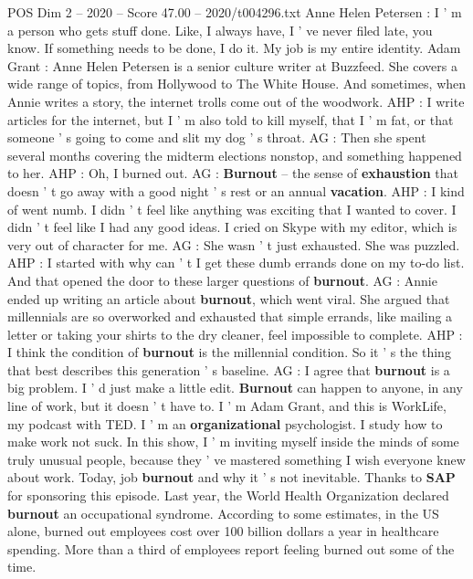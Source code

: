 \begin{textsample}{POS Dim 2 – 2020 – Score 47.00 – 2020/t004296.txt}  \label{ex:f2_pos_005}
Anne Helen Petersen : I ' m a person who gets stuff done.
Like, I always have, I ' ve never filed late, you know.
If something needs to be done, I do it.
My job is my entire identity.
Adam Grant : Anne Helen Petersen is a senior culture writer at Buzzfeed.
She covers a wide range of topics, from Hollywood to The White House.
And sometimes, when Annie writes a story, the internet trolls come out of the woodwork.
AHP : I write articles for the internet, but I ' m also told to kill myself, that I ' m fat, or that someone ' s going to come and slit my dog ' s throat.
AG : Then she spent several months covering the midterm elections nonstop, and something happened to her.
AHP : Oh, I burned out.
AG : \textbf{Burnout} -- the sense of \textbf{exhaustion} that doesn ' t go away with a good night ' s rest or an annual \textbf{vacation}.
AHP : I kind of went numb.
I didn ' t feel like anything was exciting that I wanted to cover.
I didn ' t feel like I had any good ideas.
I cried on Skype with my editor, which is very out of character for me.
AG : She wasn ' t just exhausted.
She was puzzled.
AHP : I started with why can ' t I get these dumb errands done on my to-do list.
And that opened the door to these larger questions of \textbf{burnout}.
AG : Annie ended up writing an article about \textbf{burnout}, which went viral.
She argued that millennials are so overworked and exhausted that simple errands, like mailing a letter or taking your shirts to the dry cleaner, feel impossible to complete.
AHP : I think the condition of \textbf{burnout} is the millennial condition.
So it ' s the thing that best describes this generation ' s baseline.
AG : I agree that \textbf{burnout} is a big problem.
I ' d just make a little edit. \textbf{Burnout} can happen to anyone, in any line of work, but it doesn ' t have to.
I ' m Adam Grant, and this is WorkLife, my podcast with TED.
I ' m an \textbf{organizational} psychologist.
I study how to make work not suck.
In this show, I ' m inviting myself inside the minds of some truly unusual people, because they ' ve mastered something I wish everyone knew about work.
Today, job \textbf{burnout} and why it ' s not inevitable.
Thanks to \textbf{SAP} for sponsoring this episode.
Last year, the World Health Organization declared \textbf{burnout} an occupational syndrome.
According to some estimates, in the US alone, burned out employees cost over 100 billion dollars a year in healthcare spending.
More than a third of employees report feeling burned out some of the time.

\end{textsample}
